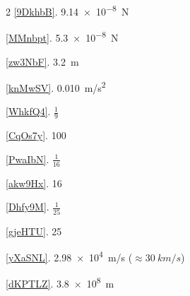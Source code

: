 \documentclass[main.tex]{subfiles}
\begin{document}
\begin{multicols}{2}
\ref{9DkhbB}. \SI{9.14e-8}{N}

\ref{MMnbpt}. \SI{5.3e-8}{N}

\ref{zw3NbF}. \SI{3.2}{m}

\ref{knMwSV}. \SI{0.010}{m/s^2}

\ref{WhkfQ4}. $\frac{1}{9}$

\ref{CqOs7y}. 100

\ref{PwaIbN}. $\frac{1}{16}$

\ref{akw9Hx}. 16

\ref{Dhfy9M}. $\frac{1}{25}$

\ref{gjeHTU}. 25

\ref{yXaSNL}. \SI{2.98e4}{m/s} ($\approx \SI{30}{km/s}$)

\ref{dKPTLZ}. \SI{3.8e8}{m}

\end{multicols}
\end{document}
